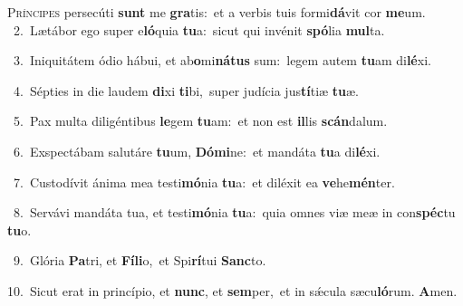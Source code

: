 \lettrine{\initial\textcolor{\initialcolor}{P}}{ríncipes} persecúti \textbf{sunt} me \textbf{gra}\-tis:~\star et a verbis tuis formi\-\textbf{dá}\-vit cor \textbf{me}\-um.\\
{\numbfont\textcolor{\numbcolor}{~2.}}~Lætábor ego super e\-\textbf{ló}\-quia \textbf{tu}\-a:~\star sicut qui invénit \textbf{spó}\-lia \textbf{mul}\-ta.\par
{\numbfont\textcolor{\numbcolor}{~3.}}~Iniquitátem ódio hábui, et ab\-\textbf{o}\-mi\-\textbf{ná}\-\textbf{tus} sum:~\star legem autem \textbf{tu}\-am di\-\textbf{lé}\-xi.\par
{\numbfont\textcolor{\numbcolor}{~4.}}~Sépties in die laudem \textbf{di}\-xi \textbf{ti}\-bi,~\star super judícia jus\-\textbf{tí}\-tiæ \textbf{tu}\-æ.\par
{\numbfont\textcolor{\numbcolor}{~5.}}~Pax multa diligéntibus \textbf{le}\-gem \textbf{tu}\-am:~\star et non est \textbf{il}\-lis \textbf{scán}\-dalum.\par
{\numbfont\textcolor{\numbcolor}{~6.}}~Exspectábam salutáre \textbf{tu}\-um, \textbf{Dó}\-\textbf{mi}ne:~\star et mandáta \textbf{tu}\-a di\-\textbf{lé}\-xi.\par
{\numbfont\textcolor{\numbcolor}{~7.}}~Custodívit ánima mea testi\-\textbf{mó}\-nia \textbf{tu}\-a:~\star et diléxit ea \textbf{ve}\-he\-\textbf{mén}\-ter.\par
{\numbfont\textcolor{\numbcolor}{~8.}}~Servávi mandáta tua, et testi\-\textbf{mó}\-nia \textbf{tu}\-a:~\star quia omnes viæ meæ in con\-\textbf{spéc}\-tu \textbf{tu}\-o.\par
{\numbfont\textcolor{\numbcolor}{~9.}}~Glória \textbf{Pa}\-tri, et \textbf{Fí}\-\textbf{li}o,~\star et Spi\-\textbf{rí}\-tui \textbf{Sanc}\-to.\par
{\numbfont\textcolor{\numbcolor}{10.}}~Sicut erat in princípio, et \textbf{nunc}\-, et \textbf{sem}\-per,~\star et in sǽcula sæcu\-\textbf{ló}\-rum. \textbf{A}\-men.\par
